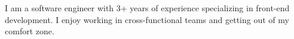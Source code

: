 

\begin{cvparagraph}

I am a software engineer with 3+ years of experience specializing in front-end development. I enjoy working in cross-functional teams and getting out of my comfort zone.
\end{cvparagraph}

